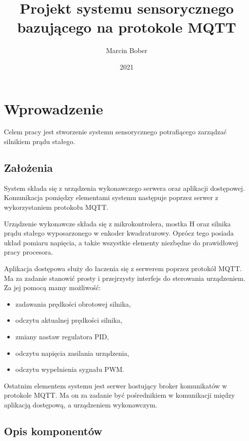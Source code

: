 \documentclass[eng, 11pt]{mgr}
\author{Marcin Bober}
\title{Projekt systemu sensorycznego bazującego na protokole MQTT}
\date{2021}
\begin{document}
  
  \maketitle
  \tableofcontents
  
  \chapter{Wprowadzenie}
  
    Celem pracy jest stworzenie systemu sensorycznego 
    potrafiącego zarządzać silnikiem prądu stałego.
  

    \section{Założenia}

      System składa się z urządzenia wykonawczego serwera 
      oraz aplikacji dostępowej. 
      Komunikacja pomiędzy elementami systemu 
      następuje poprzez serwer z wykorzystaniem protokołu MQTT.
      
      Urządzenie wykonawcze składa się z mikrokontrolera,
      mostka H oraz silnika prądu stałego wyposarzonego w enkoder
      kwadraturowy. Oprócz tego posiada układ pomiaru napięcia, a
      także wszystkie elementy niezbędne do prawidłowej pracy 
      procesora.

      Aplikacja dostępowa służy do łaczenia się z serwerem 
      poprzez protokół MQTT. Ma za zadanie stanowić prosty i 
      przejrzysty interfejs do sterowania urządzeniem.
      Za jej pomocą mamy możliwość:
  
      \begin{itemize}
        \item zadawania prędkości obrotowej silnika,
        \item odczytu aktualnej prędkości silnika,
        \item zmiany nastaw regulatora PID,
        \item odczytu napięcia zasilania urządzenia,
        \item odczytu wypełnienia sygnału PWM.
      \end{itemize}
  
      Ostatnim elementem systemu jest serwer hostujący broker
      komunikatów w protokole MQTT. Ma on za zadanie być
      pośrednikiem w komunikacji między aplikacją dostępową,
      a urządzeniem wykonawczym.

    \section{Opis komponentów}
\end{document}
